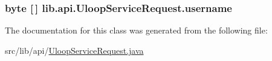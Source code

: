 \hypertarget{classlib_1_1api_1_1UloopServiceRequest_a8a929330893f001347b4df81927edd4c}{
\subsubsection[{username}]{\setlength{\rightskip}{0pt plus 5cm}byte \mbox{[}$\,$\mbox{]} lib.\+api.\+Uloop\+Service\+Request.\+username\hspace{0.3cm}{\ttfamily [private]}}}\label{classlib_1_1api_1_1UloopServiceRequest_a8a929330893f001347b4df81927edd4c}


The documentation for this class was generated from the following file\+:\begin{DoxyCompactItemize}
\item 
src/lib/api/\hyperlink{UloopServiceRequest_8java}{Uloop\+Service\+Request.\+java}\end{DoxyCompactItemize}
